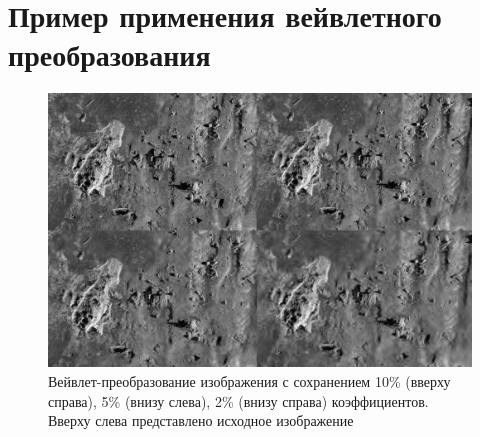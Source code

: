 \chapter{Пример применения вейвлетного преобразования}
\label{app:ex}
\begin{figure}
  \centering
  \includegraphics[scale=0.5]{inc/graphics/ex.jpg}
  \caption{Вейвлет-преобразование изображения с сохранением 10\% (вверху справа), 5\% (внизу слева), 2\% (внизу справа) коэффициентов. 
Вверху слева представлено исходное изображение}
\end{figure}

